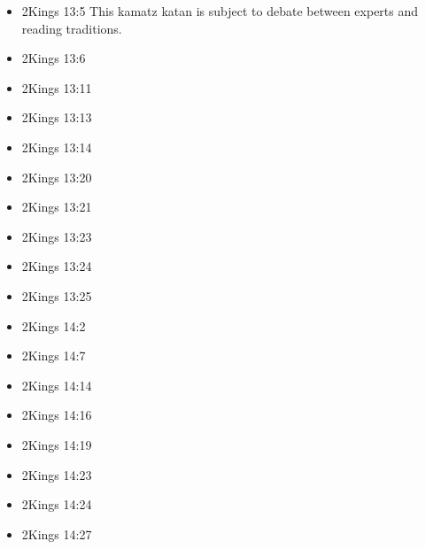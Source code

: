 \documentclass[14pt]{article}
\begin{document}
\begin{multicols}{2}
\begin{itemize}
													\item 2Kings 13:5 This kamatz katan is subject to debate between experts and reading traditions.
													
													\item 2Kings 13:6
													
													\item 2Kings 13:11
													
													\item 2Kings 13:13
													
													\item 2Kings 13:14
													
													\item 2Kings 13:20
													
													\item 2Kings 13:21
													
													\item 2Kings 13:23
													
													\item 2Kings 13:24
													
													\item 2Kings 13:25
													
													\item 2Kings 14:2
													
													\item 2Kings 14:7
													
													\item 2Kings 14:14
													
													\item 2Kings 14:16
													
													\item 2Kings 14:19
													
													\item 2Kings 14:23
													
													\item 2Kings 14:24
													
													\item 2Kings 14:27
													

\end{itemize}
\end{multicols}
\end{document}
